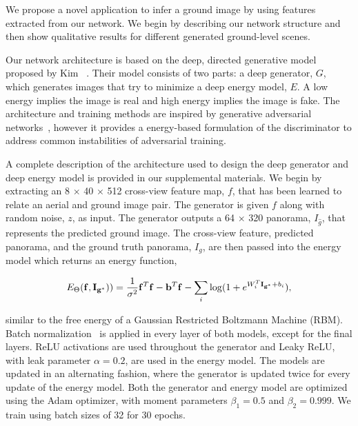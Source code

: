 We propose a novel application to infer a ground image by using features 
extracted from our network. We begin by describing our network structure and 
then show qualitative results for different generated ground-level scenes.

Our network architecture is based on the deep, directed generative model 
proposed by Kim \etal~\cite{kim2016deep}. Their model consists of two parts: a 
deep generator, $G$, which generates images that try to minimize a deep energy 
model, $E$. A low energy implies the image is real and high energy implies the 
image is fake. The architecture and training methods are inspired by generative 
adversarial networks~\cite{goodfellow2014generative}, however it provides a 
energy-based formulation of the discriminator to address common 
instabilities of adversarial training. 

A complete description of the architecture used to design the deep generator 
and deep energy model is provided in our supplemental materials. We begin by 
extracting an 8 
$\times$ 40 $\times$ 512 cross-view feature map, $f$, that has been learned to 
relate an aerial and ground image pair.  The generator is given $f$ 
along with random noise, $z$, as input. The generator outputs a 64 $\times$ 320 
panorama, $I_{\hat{g}}$, that represents the predicted ground image. The 
cross-view feature, predicted panorama, and the ground truth panorama, $I_g$, 
are then passed into the energy model which returns an energy function,

\setlength{\belowdisplayskip}{0pt} \setlength{\belowdisplayshortskip}{0pt}
\setlength{\abovedisplayskip}{0pt} \setlength{\abovedisplayshortskip}{0pt}
\begin{equation*}
E_\Theta (\mathbf{f}, \mathbf{I_{g^*}})) = \frac{1}{\sigma^2} \mathbf{f}^T 
\mathbf{f} - 
\mathbf{b}^T \mathbf{f} \\ - \sum_{i}^{} \mathrm{log}(1 + e^{W_i^T 
\mathbf{I_{g^*}} + b_i}),
\end{equation*}

\noindent similar to the free energy of a Gaussian Restricted Boltzmann Machine 
(RBM). Batch normalization~\cite{ioffe2015batch} is applied in every layer of 
both models, except for the final layers. ReLU activations are used throughout 
the generator and Leaky ReLU, with leak parameter $\alpha = 0.2$, are used in 
the energy model. The models are updated in an alternating fashion, where the 
generator is updated twice for every update of the energy 
model. Both the generator and energy model are optimized using the Adam 
optimizer, with moment parameters $\beta_1 = 0.5$ and 
$\beta_2 = 0.999$. We train using batch sizes of 32 for 30 epochs. 

